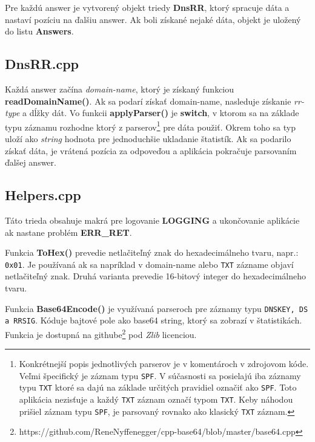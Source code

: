 \documentclass{article}
\begin{document}
        Pre každú answer je vytvorený objekt triedy \textbf{DnsRR}, ktorý spracuje dáta a nastaví pozíciu na ďalšiu answer. Ak boli získané nejaké dáta, objekt je uložený do listu
        \textbf{Answers}.

        \newpage

        \subsection{DnsRR.cpp}
        Každá answer začína \emph{domain-name}, ktorý je získaný funkciou \textbf{readDomainName()}. Ak sa podarí získať domain-name, nasleduje získanie \emph{rr-type} a dĺžky dát.
        Vo funkcii \textbf{applyParser()} je \textbf{switch}, v ktorom sa na základe typu záznamu rozhodne ktorý z parserov\footnote{Konkrétnejší popis jednotlivých parserov je v komentároch v zdrojovom kóde. 
        Veľmi špecifický je záznam typu \texttt{SPF}. V súčasnosti sa posielajú iba záznamy typu \texttt{TXT} ktoré sa dajú na základe určitých pravidiel označiť ako \texttt{SPF}. Toto aplikácia nezisťuje
        a každý \texttt{TXT} záznam označí typom \texttt{TXT}. Keby náhodou prišiel záznam typu \texttt{SPF}, je parsovaný rovnako ako klasický \texttt{TXT} záznam.} pre dáta použiť. Okrem toho sa typ uloží ako \emph{string}
        hodnota pre jednoduchšie ukladanie štatistík. Ak sa podarilo získať dáta, je vrátená pozícia za odpoveďou a aplikácia pokračuje parsovaním ďalšej answer.

        \subsection{Helpers.cpp}
        Táto trieda obsahuje makrá pre logovanie \textbf{LOGGING} a ukončovanie aplikácie ak nastane problém \textbf{ERR\_RET}.

        Funkcia \textbf{ToHex()} prevedie netlačiteľný znak do hexadecimálneho tvaru, napr.: \texttt{0x01}. Je používaná ak sa napríklad v domain-name alebo \texttt{TXT}
        zázname objaví netlačiteľný znak. Druhá varianta prevedie 16-bitový integer do hexadecimálneho tvaru.

        Funkcia \textbf{Base64Encode()} je využívaná parseroch pre záznamy typu \texttt{DNSKEY, DS a RRSIG}. Kóduje bajtové pole ako base64 string, ktorý sa zobrazí v štatistikách.
        Funkcia je dostupná na githube\footnote{https://github.com/ReneNyffenegger/cpp-base64/blob/master/base64.cpp} pod \emph{Zlib} licenciou. 

        \newpage
\end{document}
